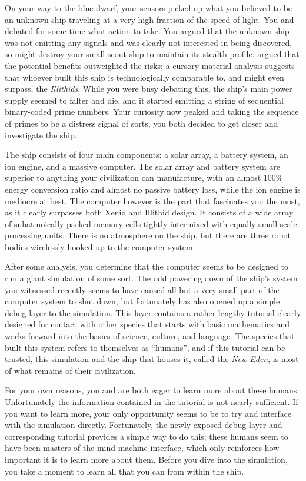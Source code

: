 \documentclass[char]{guildcamp1}
\begin{document}
On your way to the blue dwarf, your sensors picked up what you believed to be an unknown ship traveling at a very high fraction of the speed of light. You and \cActive{\they} debated for some time what action to take. You argued that the unknown ship was not emitting any signals and was clearly not interested in being discovered, so might destroy your small scout ship to maintain its stealth profile. \cActive{\they} argued that the potential benefits outweighted the risks; a cursory material analysis suggests that whoever built this ship is technologically comparable to, and might even surpass, the \emph{Illithids}. While you were busy debating this, the ship's main power supply seemed to falter and die, and it started emitting a string of sequential binary-coded prime numbers. Your curiosity now peaked and taking the sequence of primes to be a distress signal of sorts, you both decided to get closer and investigate the ship.

The ship consists of four main components: a solar array, a battery system, an ion engine, and a massive computer. The solar array and battery system are superior to anything your civilization can manufacture, with an almost 100\% energy conversion ratio and almost no passive battery loss, while the ion engine is mediocre at best. The computer however is the part that fascinates you the most, as it clearly surpasses both Xenid and Illithid design. It consists of a wide array of subatmoically packed memory cells tightly intermixed with equally small-scale processing units. There is no atmosphere on the ship, but there are three robot bodies wirelessly hooked up to the computer system.

After some analysis, you determine that the computer seems to be designed to run a giant simulation of some sort. The odd powering down of the ship's system you witnessed recently seems to have caused all but a very small part of the computer system to shut down, but fortunately has also opened up a simple debug layer to the simulation. This layer contains a rather lengthy tutorial clearly designed for contact with other species that starts with basic mathematics and works forward into the basics of science, culture, and language. The species that built this system refers to themselves as ``humans'', and if this tutorial can be trusted, this simulation and the ship that houses it, called the \emph{New Eden}, is most of what remains of their civilization.

For your own reasons, you and \cActive{\they} are both eager to learn more about these humans. Unfortunately the information contained in the tutorial is not nearly sufficient. If you want to learn more, your only opportunity seems to be to try and interface with the simulation directly. Fortunately, the newly exposed debug layer and corresponding tutorial provides a simple way to do this; these humans seem to have been masters of the mind-machine interface, which only reinforces how important it is to learn more about them. Before you dive into the simulation, you take a moment to learn all that you can from within the ship.
\end{document}
